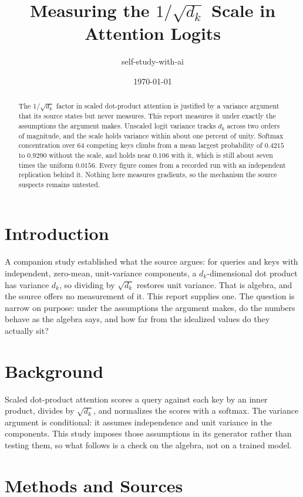 \documentclass[11pt]{article}
\title{Measuring the $1/\sqrt{d_k}$ Scale in Attention Logits}
\author{self-study-with-ai}
\date{\today}
\begin{document}
\maketitle

\begin{abstract}
The $1/\sqrt{d_k}$ factor in scaled dot-product attention is justified by a
variance argument that its source states but never measures. This report
measures it under exactly the assumptions the argument makes. Unscaled logit
variance tracks $d_k$ across two orders of magnitude, and the scale holds
variance within about one percent of unity. Softmax concentration over 64
competing keys climbs from a mean largest probability of $0.4215$ to $0.9290$
without the scale, and holds near $0.106$ with it, which is still about seven
times the uniform $0.0156$. Every figure comes from a recorded run with an
independent replication behind it. Nothing here measures gradients, so the
mechanism the source suspects remains untested.
\end{abstract}

\section{Introduction}

A companion study established what the source argues: for queries and keys
with independent, zero-mean, unit-variance components, a $d_k$-dimensional dot
product has variance $d_k$, so dividing by $\sqrt{d_k}$ restores unit
variance. That is algebra, and the source offers no measurement of it. This
report supplies one. The question is narrow on purpose: under the assumptions
the argument makes, do the numbers behave as the algebra says, and how far
from the idealized values do they actually sit?

\section{Background}

Scaled dot-product attention scores a query against each key by an inner
product, divides by $\sqrt{d_k}$, and normalizes the scores with a softmax.
The variance argument is conditional: it assumes independence and unit
variance in the components. This study imposes those assumptions in its
generator rather than testing them, so what follows is a check on the algebra,
not on a trained model.

\section{Methods and Sources}
\end{document}
